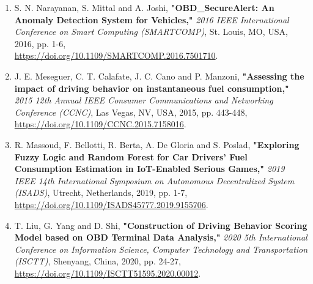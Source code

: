 \begin{enumerate}
    \item S. N. Narayanan, S. Mittal and A. Joshi, \textbf{"OBD\_SecureAlert: An Anomaly Detection System for Vehicles,"} \textit{2016 IEEE International Conference on Smart Computing (SMARTCOMP)}, St. Louis, MO, USA, 2016, pp. 1-6,\\ \url{https://doi.org/10.1109/SMARTCOMP.2016.7501710}.

    \item J. E. Meseguer, C. T. Calafate, J. C. Cano and P. Manzoni, \textbf{"Assessing the impact of driving behavior on instantaneous fuel consumption,"} \textit{2015 12th Annual IEEE Consumer Communications and Networking Conference (CCNC)}, Las Vegas, NV, USA, 2015, pp. 443-448, \url{https://doi.org/10.1109/CCNC.2015.7158016}.

    \item R. Massoud, F. Bellotti, R. Berta, A. De Gloria and S. Poslad, \textbf{"Exploring Fuzzy Logic and Random Forest for Car Drivers’ Fuel Consumption Estimation in IoT-Enabled Serious Games,"} \textit{2019 IEEE 14th International Symposium on Autonomous Decentralized System (ISADS)}, Utrecht, Netherlands, 2019, pp. 1-7, \url{https://doi.org/10.1109/ISADS45777.2019.9155706}.

    \item T. Liu, G. Yang and D. Shi, \textbf{"Construction of Driving Behavior Scoring Model based on OBD Terminal Data Analysis,"} \textit{2020 5th International Conference on Information Science, Computer Technology and Transportation (ISCTT)}, Shenyang, China, 2020, pp. 24-27, \url{https://doi.org/10.1109/ISCTT51595.2020.00012}.
\end{enumerate}
